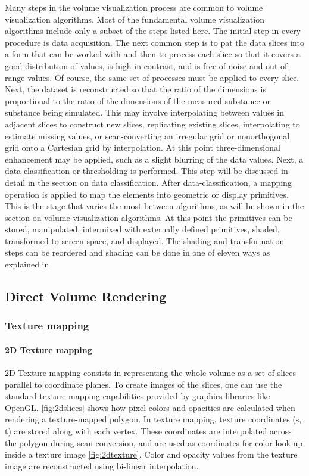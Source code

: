 Many steps in the volume visualization process are common to
volume visualization algorithms.  Most of the fundamental volume
visualization algorithms include only a subset of the steps listed
here.
The initial step in every procedure is data acquisition. The next
common step is to pat the data slices into a form that can be worked
with and then to process each slice so that it covers a good
distribution of values, is high in contrast, and is free of noise and
out-of-range values. Of course, the same set of processes must be
applied to every slice.
Next, the dataset is reconstructed so that the ratio of the
dimensions is proportional to the ratio of the dimensions of the
measured substance or substance being simulated. This may
involve interpolating between values in adjacent slices to construct
new slices, replicating existing slices, interpolating to estimate
missing values, or scan-converting an irregular grid or nonorthogonal
grid onto a Cartesian grid by interpolation. At this point
three-dimensional enhancement may be applied, such as a slight
blurring of the data values. Next, a data-classification or
thresholding is performed. This step will be discussed in detail in
the section on data classification.
After data-classification, a mapping operation is applied to map
the elements into geometric or display primitives. This is the stage
that varies the most between algorithms, as will be shown in the
section on volume visualization algorithms. At this point the
primitives can be stored, manipulated, intermixed with externally
defined primitives, shaded, transformed to screen space, and
displayed. The shading and transformation steps can be reordered
and shading can be done in one of eleven ways as explained in 


\subsection{Direct Volume Rendering}

\subsubsection{Texture mapping}

\paragraph{2D Texture mapping}
2D Texture mapping consists in representing the whole volume as a set of slices parallel to coordinate planes. To create images of the slices, one can use the standard texture mapping capabilities provided by graphics libraries like OpenGL. \ref{fig:2dslices} shows how pixel colors and opacities are calculated when rendering a texture-mapped polygon. In texture mapping, texture coordinates (s, t) are stored along with each vertex. These coordinates are interpolated across the polygon during scan conversion, and are used as coordinates for color look-up inside a texture image \ref{fig:2dtexture}. Color and opacity values from the texture image are reconstructed using bi-linear interpolation.


